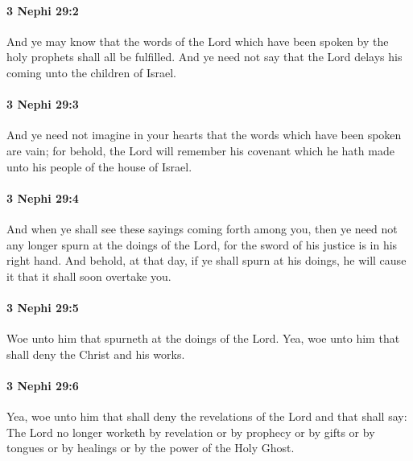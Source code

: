 		\paragraph{3 Nephi 29:2} %
			\label{3NEPHI-29-2}

			And ye may know that the words of the Lord
			which have been spoken by the holy prophets shall all be fulfilled.
			And ye need not say
			that the Lord delays his coming unto the children of Israel.

		\paragraph{3 Nephi 29:3} %
			\label{3NEPHI-29-3}

			And ye need not imagine in your hearts
			that the words which have been spoken are vain;
			for behold, the Lord will remember his covenant
			which he hath made unto his people of the house of Israel.

		\paragraph{3 Nephi 29:4} %
			\label{3NEPHI-29-4}

			And when ye shall see these sayings coming forth among you,
			then ye need not any longer spurn at the doings of the Lord,
			for the sword of his justice is in his right hand.
			And behold, at that day, if ye shall spurn at his doings,
			he will cause it that it shall soon overtake you.

		\paragraph{3 Nephi 29:5} %
			\label{3NEPHI-29-5}

			Woe unto him that spurneth at the doings of the Lord.
			Yea, woe unto him that shall deny the Christ and his works.

		\paragraph{3 Nephi 29:6} %
			\label{3NEPHI-29-6}

			Yea, woe unto him that shall deny the revelations of the Lord and that shall say:
			The Lord no longer worketh by revelation or by prophecy
			or by gifts or by tongues or by healings or by the power of the Holy Ghost.

